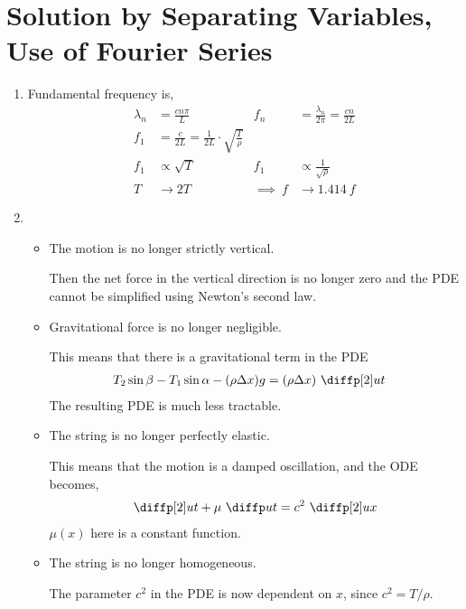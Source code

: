 \section{Solution by Separating Variables, Use of Fourier Series}

\begin{enumerate}
    \item Fundamental frequency is,
          \begin{align}
              \lambda_n   & = \frac{cn\pi}{L}                        &
              f_n         & = \frac{\lambda_n}{2\pi} = \frac{cn}{2L}   \\
              f_1         & = \frac{c}{2L} = \frac{1}{2L} \cdot
              \sqrt{\frac{T}{\rho}}                                    \\
              f_1         & \propto \sqrt{T}                         &
              f_1         & \propto \frac{1}{\sqrt{\rho}}              \\
              T           & \to 2T                                   &
              \implies\ f & \to 1.414\ f
          \end{align}

    \item \begin{itemize}
              \item {\color{violet3}The motion is no longer strictly vertical}.\par
                    Then the net force in the vertical direction is no longer zero and
                    the PDE cannot be simplified using Newton's second law.
              \item {\color{violet3}Gravitational force is no longer negligible}. \par
                    This means that there is a gravitational term in the PDE
                    \begin{align}
                        T_2 \sin \beta - T_1 \sin \alpha - (\rho \Delta x) g & =
                        (\rho \Delta x)\ \diffp[2] ut
                    \end{align}
                    The resulting PDE is much less tractable.
              \item {\color{violet3}The string is no longer perfectly elastic}. \par
                    This means that the motion is a damped oscillation, and the ODE
                    becomes,
                    \begin{align}
                        \diffp[2] ut + \mu\ \diffp ut = c^2\ \diffp[2] ux
                    \end{align}
                    $ \mu(x) $ here is a constant function.
              \item {\color{violet3}The string is no longer homogeneous}. \par
                    The parameter $ c^2 $ in the PDE is now dependent on $ x $, since
                    $ c^2  = T / \rho $.
          \end{itemize}


\end{enumerate}
